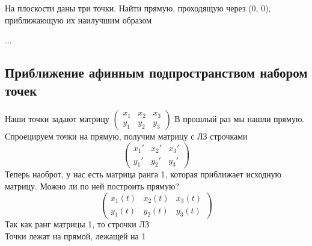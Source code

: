 \documentclass[12pt, fleqn]{article}
\begin{document}
    \begin{task}
        На плоскости даны три точки. Найти прямую, проходящую через (0, 0), приближающую их наилучшим образом
    \end{task}

    \begin{sol}
        ...
    \end{sol}

    \subsection{Приближение афинным подпространством набором точек}

    \begin{remark}
        Наши точки задают матрицу $\begin{pmatrix}
            x_1 & x_2 & x_3\\
            y_1 & y_2 & y_3
        \end{pmatrix}$
        В прошлый раз мы нашли прямую. Спроецируем точки на прямую, получим матрицу с ЛЗ строчками
        \[\begin{pmatrix}
            x_1' & x_2' & x_3'\\
            y_1' & y_2' & y_3'
        \end{pmatrix}\]
        Теперь наоброт, у нас есть матрица ранга 1, которая приближает исходную матрицу. Можно ли по ней построить прямую?
        \[\begin{pmatrix}
            x_1(t) & x_2(t) & x_3(t)\\
            y_1(t) & y_2(t) & y_3(t)
        \end{pmatrix}\]
        Так как ранг матрицы 1, то строчки ЛЗ\\
        Точки лежат на прямой, лежащей на 1
    \end{remark}
\end{document}
